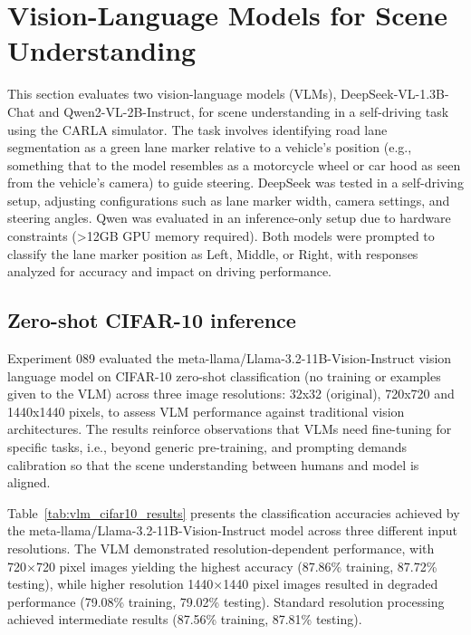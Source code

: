 \section{Vision-Language Models for Scene Understanding}
\label{sec:vlm_scene_understanding}

This section evaluates two vision-language models (VLMs), DeepSeek-VL-1.3B-Chat and Qwen2-VL-2B-Instruct, for scene understanding in a self-driving task using the CARLA simulator. The task involves identifying road lane segmentation as a green lane marker relative to a vehicle's position (e.g., something that to the model resembles as a motorcycle wheel or car hood as seen from the vehicle's camera) to guide steering. DeepSeek was tested in a self-driving setup, adjusting configurations such as lane marker width, camera settings, and steering angles. Qwen was evaluated in an inference-only setup due to hardware constraints (>12GB GPU memory required). Both models were prompted to classify the lane marker position as Left, Middle, or Right, with responses analyzed for accuracy and impact on driving performance.


\subsection{Zero-shot CIFAR-10 inference}

Experiment 089 evaluated the meta-llama/Llama-3.2-11B-Vision-Instruct vision language model on CIFAR-10 zero-shot classification (no training or examples given to the VLM) across three image resolutions: 32x32 (original), 720x720 and 1440x1440 pixels, to assess VLM performance against traditional vision architectures. The results reinforce observations that VLMs need fine-tuning for specific tasks, i.e., beyond generic pre-training, and prompting demands calibration so that the scene understanding between humans and model is aligned.

Table~\ref{tab:vlm_cifar10_results} presents the classification accuracies achieved by the meta-llama/Llama-3.2-11B-Vision-Instruct model across three different input resolutions. The VLM demonstrated resolution-dependent performance, with 720×720 pixel images yielding the highest accuracy (87.86\% training, 87.72\% testing), while higher resolution 1440×1440 pixel images resulted in degraded performance (79.08\% training, 79.02\% testing). Standard resolution processing achieved intermediate results (87.56\% training, 87.81\% testing).

